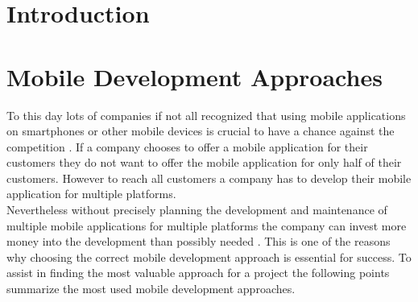 \documentclass[Bachelor,BIF,english]{twbook}
\begin{document}
{{{    \newcommand{\citefigm}[2]{(Source: taken with modification from \protect\cite{#1}, p. #2)}%
    \newcommand{\citep}{\citeasnoun}%
    \newcommand{\acessedthrough}{Available at:}%
    \newcommand{\acessedthroughp}{Available through:}%
    \newcommand{\acessedat}{Accessed}%
    \newcommand{\singlepage}{p.}%
    \newcommand{\multiplepages}{pp.}%
    \newcommand{\chapternr}{Ch.}%
    \renewcommand{\harvardand}{\&}%
    \newcommand{\abstractonly}{Abstract only}
    \newcommand{\edition}{~edition}%
}}}

\maketitle
\chapter{Introduction}

\chapter{Mobile Development Approaches}
To this day lots of companies if not all recognized that using mobile applications on smartphones or other mobile devices is crucial to have a chance against the competition \cite[p.~1]{7479278}. If a company chooses to offer a mobile application for their customers they do not want to offer the mobile application for only half of their customers. However to reach all customers a company has to develop their mobile application for multiple platforms. 
\\[\baselineskip]
Nevertheless without precisely planning the development and maintenance of multiple mobile applications for multiple platforms the company can invest more money into the development than possibly needed \cite[p.~1]{JohanssonSderberg2018} \cite[p.~5,~8]{Steczko2016} \cite[p.~757]{Ciman2014}. This is one of the reasons why choosing the correct mobile development approach is essential for success. To assist in finding the most valuable approach for a project the following points summarize the most used mobile development approaches. 
\end{document}

